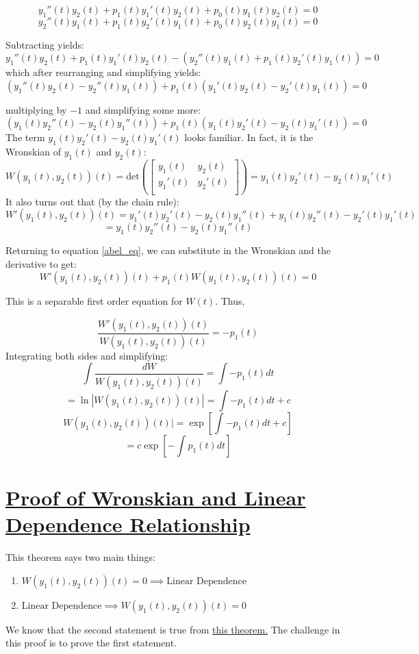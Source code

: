 \documentclass{report}
\begin{document}
$$y_1''(t)y_2(t) + p_1(t)y_1'(t)y_2(t) + p_0(t)y_1(t)y_2(t) = 0$$
$$y_2''(t)y_1(t) + p_1(t)y_2'(t)y_1(t) + p_0(t)y_2(t)y_1(t) = 0$$

Subtracting yields:
$$y_1''(t)y_2(t) + p_1(t)y_1'(t)y_2(t) - (y_2''(t)y_1(t) + p_1(t)y_2'(t)y_1(t)) = 0$$
which after rearranging and simplifying yields:
\begin{equation}
\label{abel_eq}
(y_1''(t)y_2(t)-y_2''(t)y_1(t))+p_1(t)(y_1'(t)y_2(t)-y_2'(t)y_1(t)) = 0
\end{equation}

multiplying by $-1$ and simplifying some more:
$$(y_1(t)y_2''(t)-y_2(t)y_1''(t))+p_1(t)(y_1(t)y_2'(t)-y_2(t)y_1'(t)) = 0$$
The term $y_1(t)y_2'(t)-y_2(t)y_1'(t)$ looks familiar. In fact, it is the Wronskian of $y_1(t)$ and $y_2(t)$:
$$
    W(y_1(t), y_2(t))(t) =
    \text{det}\left(\begin{bmatrix}
        y_1(t) & y_2(t) \\
        y_1'(t) & y_2'(t) \\
        \end{bmatrix}\right)
    = y_1(t)y_2'(t)-y_2(t)y_1'(t)
$$
It also turns out that (by the chain rule):
$$
W'(y_1(t), y_2(t))(t) = y_1'(t)y_2'(t)-y_2(t)y_1''(t)+y_1(t)y_2''(t)-y_2'(t)y_1'(t)
$$
$$=y_1(t)y_2''(t)-y_2(t)y_1''(t)$$

Returning to equation \ref{abel_eq}, we can substitute in the Wronskian and the derivative to get:
$$W'(y_1(t),y_2(t))(t) + p_1(t)W(y_1(t), y_2(t))(t) = 0$$

This is a separable first order equation for $W(t)$. Thus,

$$\frac{W'(y_1(t),y_2(t))(t)}{W(y_1(t), y_2(t))(t)} = -p_1(t)$$
Integrating both sides and simplifying:
$$\int{\frac{dW}{W(y_1(t), y_2(t))(t)} }= \int{-p_1(t)dt}$$
$$=\ln|W(y_1(t), y_2(t))(t)| = \int{-p_1(t)dt} + c$$
$$W(y_1(t), y_2(t))(t)| = \exp{\left[\int{-p_1(t)dt} + c\right]}$$
$$=c\exp{\left[-\int{p_1(t)dt}\right]}$$


\section{\hyperref[th:WrLinDep]{Proof of Wronskian and Linear Dependence Relationship}}
\label{sec:PrWrLinDep}
This theorem says two main things:
\begin{enumerate}
    
    \item$W(y_1(t), y_2(t))(t) = 0 \implies \text{Linear Dependence}$
    
    \item$ \text{Linear Dependence} \implies W(y_1(t), y_2(t))(t) = 0$
\end{enumerate}
We know that the second statement is true from \hyperref[th:wronLinDep]{this theorem.} The challenge in this proof is to prove the first statement.
\end{document}
